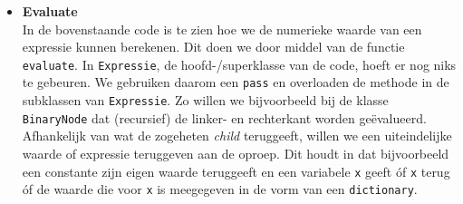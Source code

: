 \documentclass[12pt]{article}
\begin{document}
\begin{itemize}
\item \textbf{Evaluate}\\
In de bovenstaande code is te zien hoe we de numerieke waarde van een expressie kunnen berekenen. Dit doen we door middel van de functie \texttt{evaluate}. In \texttt{Expressie}, de hoofd-/superklasse van de code, hoeft er nog niks te gebeuren. We gebruiken daarom een \texttt{pass} en overloaden de methode in de subklassen van \texttt{Expressie}. Zo willen we bijvoorbeeld bij de klasse \texttt{BinaryNode} dat (recursief) de linker- en rechterkant worden ge\"{e}valueerd. Afhankelijk van wat de zogeheten \textit{child} teruggeeft, willen we een uiteindelijke waarde of expressie teruggeven aan de oproep. Dit houdt in dat bijvoorbeeld een constante zijn eigen waarde teruggeeft en een variabele \texttt{x} geeft \'{o}f \texttt{x} terug \'{o}f de waarde die voor \texttt{x} is meegegeven in de vorm van een \texttt{dictionary}.
\end{itemize}
\vspace{1pc}
\end{document}
